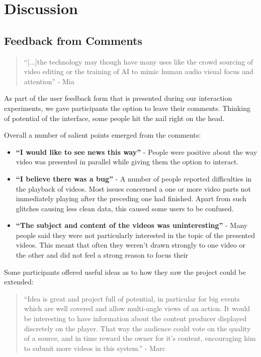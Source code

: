 \section{Discussion}

\subsection{Feedback from Comments}

\begin{quote}
  ``[...]the technology may though have many uses like the crowd sourcing of video editing or the training of AI to mimic human audio visual focus and attention'' - Mia
\end{quote}

As part of the user feedback form that is presented during our interaction experiments, we gave participants the option to leave their comments. Thinking of potential of the interface, some people hit the nail right on the head.

Overall a number of salient points emerged from the comments:

\begin{itemize}
  \item \textbf{``I would like to see news this way''} - People were positive about the way video was presented in parallel while giving them the option to interact.
  \item \textbf{``I believe there was a bug''} - A number of people reported difficulties in the playback of videos. Most issues concerned a one or more video parts not immediately playing after the preceding one had finished. Apart from such glitches causing less clean data, this caused some users to be confused.
  \item \textbf{``The subject and content of the videos was uninteresting''} - Many people said they were not particularly interested in the topic of the presented videos. This meant that often they weren't drawn strongly to one video or the other and did not feel a strong reason to focus their 
  
\end{itemize}


Some participants offered useful ideas as to how they saw the project could be extended:

\begin{quote}
  ``Idea is great and project full of potential, in particular for big events which are well covered and allow multi-angle views of an action. It would be interesting to have information about the content producer displayed discretely on the player. That way the audience could vote on the quality of a source, and in time reward the owner for it's content, encouraging him to submit more videos in this system.'' - Marc
\end{quote}
